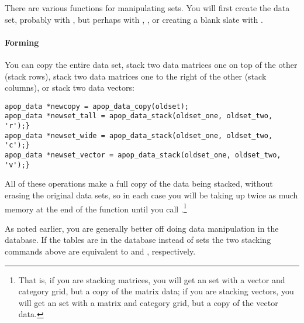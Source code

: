 
There are
various functions for manipulating  sets. You will
first
create the data set, probably with , but perhaps
with , , or
creating a blank slate with .
  
\paragraph{Forming }
You can copy the entire data set, 
stack two data matrices one on top of the other (stack rows), 
stack two data matrices one to the right of the other (stack columns),
or stack two data vectors:
\begin{lstlisting}
apop_data *newcopy = apop_data_copy(oldset);
apop_data *newset_tall = apop_data_stack(oldset_one, oldset_two, 'r');}
apop_data *newset_wide = apop_data_stack(oldset_one, oldset_two, 'c');}
apop_data *newset_vector = apop_data_stack(oldset_one, oldset_two, 'v');}
\end{lstlisting}

All of these operations make a full copy of the data being stacked, without
erasing the original data sets, so in each case
you will be taking up twice as much memory
at the end of the function until you call
.\footnote{That is, 
if you are stacking matrices, you will get an  set with a
 vector and category grid, but a copy of the matrix data; 
if you are stacking vectors, you will get an  set with a
 matrix and category grid, but a copy of the vector 
data.} 

As
noted earlier, you are generally better off doing data manipulation
in the database. If the tables are in the database instead of
 sets the two stacking commands above are equivalent
to 
and ,
respectively.

